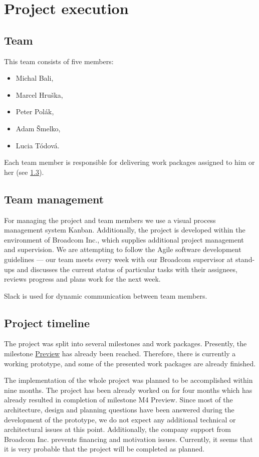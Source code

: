 \chapter{Project execution}

\section{Team}
This team consists of five members:

\begin{itemize}
	\item Michal Bali,
	\item Marcel Hruška,
	\item Peter Polák,
	\item Adam Šmelko,
	\item Lucia Tódová.
\end{itemize}

Each team member is responsible for delivering work packages assigned to him or her (see \cref{timeline}). 

\section{Team management} 

For managing the project and team members we use a visual process management system Kanban. Additionally, the project is developed within the environment of Broadcom Inc., which supplies additional project management and supervision. We are attempting to follow the Agile software development guidelines --- our team meets every week with our Broadcom supervisor at stand-ups and discusses the current status of particular tasks with their assignees, reviews progress and plans work for the next week. 

Slack is used for dynamic communication between team members.

\section{Project timeline}
\label{timeline}
The project was split into several milestones and work packages. Presently, the milestone \hyperref[milestone_preview]{Preview} has already been reached. Therefore, there is currently a working prototype, and some of the presented work packages are already finished. 

The implementation of the whole project was planned to be accomplished within nine months. The project has been already worked on for four months which has already resulted in completion of milestone M4 Preview. Since most of the architecture, design and planning questions have been answered during the development of the prototype, we do not expect any additional technical or architectural issues at this point. Additionally, the company support from Broadcom Inc. prevents financing and motivation issues. Currently, it seems that it is very probable that the project will be completed as planned. 

